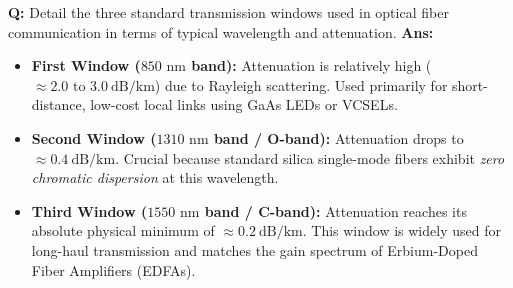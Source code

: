 \documentclass[10pt,a4paper,twocolumn]{article}
\begin{document}
\begin{tcolorbox}[
  colback=white,
  colframe=UnitColorThree,
  colbacktitle=gray!10!white,
  coltitle=black,
  fonttitle=\bfseries\sffamily\small,
  title={Unit III $\bullet$ Card 3: Optical Transmission Windows},
  boxrule=1.2pt,
  arc=2mm,
  outer arc=2mm,
  boxsep=1.5mm,
  top=1mm,
  bottom=1mm,
  left=1.5mm,
  right=1.5mm,
  before skip=2.5mm,
  after skip=2.5mm
]
\textbf{Q:} Detail the three standard transmission windows used in optical fiber communication in terms of typical wavelength and attenuation.
\tcbline
\textbf{Ans:} \begin{itemize}
  \item   \textbf{First Window ($850\text{ nm}$ band):} Attenuation is relatively high ($\approx 2.0 \text{ to } 3.0\ \text{dB/km}$) due to Rayleigh scattering. Used primarily for short-distance, low-cost local links using GaAs LEDs or VCSELs.
  \item   \textbf{Second Window ($1310\text{ nm}$ band / O-band):} Attenuation drops to $\approx 0.4\ \text{dB/km}$. Crucial because standard silica single-mode fibers exhibit \textit{zero chromatic dispersion} at this wavelength.
  \item   \textbf{Third Window ($1550\text{ nm}$ band / C-band):} Attenuation reaches its absolute physical minimum of $\approx 0.2\ \text{dB/km}$. This window is widely used for long-haul transmission and matches the gain spectrum of Erbium-Doped Fiber Amplifiers (EDFAs).
\end{itemize}
\end{tcolorbox}
\end{document}
